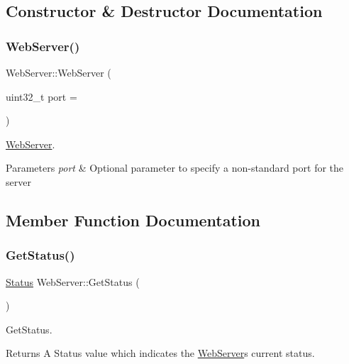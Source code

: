 \subsection{Constructor \& Destructor Documentation}
\mbox{\label{classWebServer_a456687b9d497b2810e3660f08bfa8462}} 
\subsubsection{\texorpdfstring{Web\+Server()}{WebServer()}}
{\footnotesize\ttfamily Web\+Server\+::\+Web\+Server (\begin{DoxyParamCaption}\item[{uint32\+\_\+t}]{port = {} }\end{DoxyParamCaption})}



\hyperlink{classWebServer}{Web\+Server}. 


\begin{DoxyParams}{Parameters}
{\em port} & Optional parameter to specify a non-\/standard port for the server \\
\hline
\end{DoxyParams}


\subsection{Member Function Documentation}
\mbox{\label{classWebServer_a191564ab545bdb1aa90ed40cfa966836}} 
\subsubsection{\texorpdfstring{Get\+Status()}{GetStatus()}}
{\footnotesize\ttfamily \hyperlink{classWebServer_a350f14f5d1522610502fb95f346e4a3c}{Status} Web\+Server\+::\+Get\+Status (\begin{DoxyParamCaption}{ }\end{DoxyParamCaption})}



Get\+Status. 

\begin{DoxyReturn}{Returns}
A Status value which indicates the {\ttfamily \hyperlink{classWebServer}{Web\+Server}\textquotesingle{}s} current status. 
\end{DoxyReturn}
\mbox{\label{classWebServer_a0ce9a771f7adb84c47c748a9a19444fe}} 
